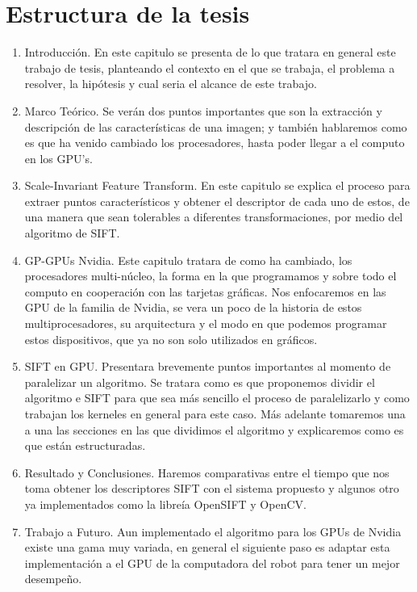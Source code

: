 \section{Estructura de la tesis}
\begin{enumerate}




\item Introducción. En este capitulo se presenta de lo que tratara en general este trabajo de tesis, planteando el contexto en el que se trabaja, el problema a resolver, la hipótesis y cual seria el alcance de este trabajo.\\

\item Marco Teórico. Se verán dos puntos importantes que son la extracción y descripción de las características de una imagen; y también hablaremos como es que ha venido cambiado los procesadores, hasta poder llegar a el computo en los GPU's.\\

\item Scale-Invariant Feature Transform. En este capitulo se explica el proceso para extraer puntos característicos y obtener el descriptor de cada uno de estos, de una manera que sean tolerables a diferentes transformaciones, por medio del algoritmo de SIFT.\\


\item GP-GPUs Nvidia.  Este capitulo tratara de como ha cambiado, los procesadores multi-núcleo, la forma en la que programamos y sobre todo el computo en cooperación con las tarjetas gráficas. Nos enfocaremos en las GPU de la familia de Nvidia, se vera un poco de la historia de estos multiprocesadores, su arquitectura y el modo en que podemos programar estos dispositivos, que ya no son solo utilizados en gráficos.\\


\item SIFT en GPU. Presentara brevemente puntos importantes al momento de paralelizar un algoritmo.
Se tratara como es que proponemos dividir el algoritmo e SIFT para que sea más sencillo el proceso de paralelizarlo y como trabajan los kerneles en general para este caso.
Más adelante tomaremos una a una las secciones en las que dividimos el algoritmo y explicaremos como es que están estructuradas.\\


\item Resultado y Conclusiones. Haremos comparativas entre el tiempo que nos toma obtener los descriptores SIFT con el sistema propuesto y algunos otro ya implementados como la libreía OpenSIFT y OpenCV.\\

\item Trabajo a Futuro. Aun implementado el algoritmo para los GPUs de Nvidia existe una gama muy variada, en general el siguiente paso es adaptar esta implementación a el GPU de la computadora del robot para tener un mejor desempeño.\\

\end{enumerate}





